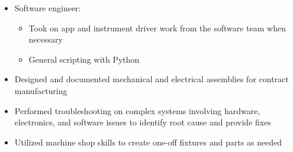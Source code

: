 {\begin{itemize}
\begin{itemize}
            \item Cross-functionally gathered requirements, led design reviews, and managed equipment and system validation across the CLIA lab staff, equipment service team, and development scientists
            \item Assessed what work was required, generated and maintained a timeline, and tracked and distributed work amongst myself and others
            \item Successfully completed the project ahead of schedule and without issues
        \end{itemize}%
        \item Software engineer:
        \begin{itemize}%
            \item Took on app and instrument driver work from the software team when necessary
            \item General scripting with Python
        \end{itemize}%
        \item Designed and documented mechanical and electrical assemblies for contract manufacturing
        \item Performed troubleshooting on complex systems involving hardware, electronics, and software issues to identify root cause and provide fixes
        \item Utilized machine shop skills to create one-off fixtures and parts as needed
    \end{itemize}
}
\divLine
{}
\divLine
{}

